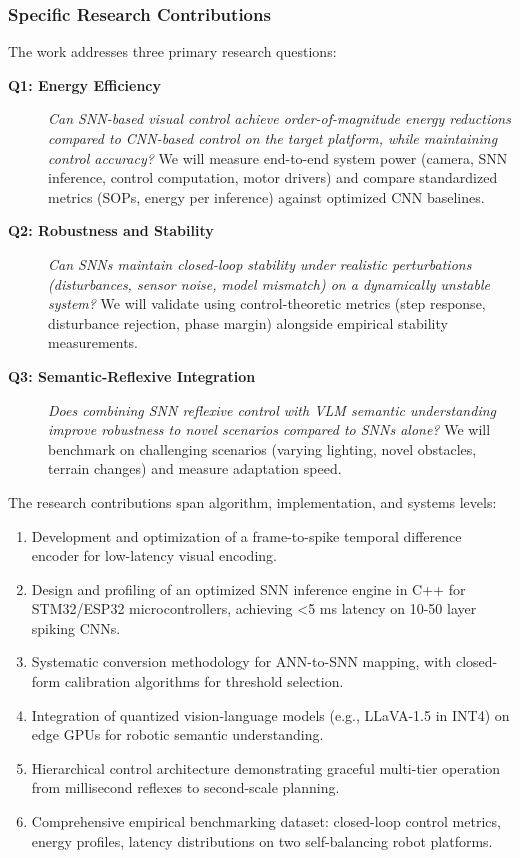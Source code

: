 \subsubsection{Specific Research Contributions}

The work addresses three primary research questions:

\begin{description}
    
\item[\textbf{Q1: Energy Efficiency}] \textit{Can SNN-based visual control achieve order-of-magnitude energy 
reductions compared to CNN-based control on the target platform, while maintaining control accuracy?} We will 
measure end-to-end system power (camera, SNN inference, control computation, motor drivers) and compare 
standardized metrics (SOPs, energy per inference) against optimized CNN baselines.

    
\item[\textbf{Q2: Robustness and Stability}] \textit{Can SNNs maintain closed-loop stability under realistic 
perturbations (disturbances, sensor noise, model mismatch) on a dynamically unstable system?} We will validate 
using control-theoretic metrics (step response, disturbance rejection, phase margin) alongside empirical 
stability measurements.

    
\item[\textbf{Q3: Semantic-Reflexive Integration}] \textit{Does combining SNN reflexive control with VLM 
semantic understanding improve robustness to novel scenarios compared to SNNs alone?} We will benchmark on 
challenging scenarios (varying lighting, novel obstacles, terrain changes) and measure adaptation speed.

\end{description}

The research contributions span algorithm, implementation, and systems levels:

\begin{enumerate}
    \item Development and optimization of a frame-to-spike temporal difference encoder for low-latency visual encoding.
    \item Design and profiling of an optimized SNN inference engine in C++ for STM32/ESP32 microcontrollers, achieving 
    <5 ms latency on 10-50 layer spiking CNNs.
    \item Systematic conversion methodology for ANN-to-SNN mapping, with closed-form calibration algorithms for 
    threshold selection.
    \item Integration of quantized vision-language models (e.g., LLaVA-1.5 in INT4) on edge GPUs for robotic 
    semantic understanding.
    \item Hierarchical control architecture demonstrating graceful multi-tier operation from millisecond reflexes 
    to second-scale planning.
    \item Comprehensive empirical benchmarking dataset: closed-loop control metrics, energy profiles, latency 
    distributions on two self-balancing robot platforms.
\end{enumerate}